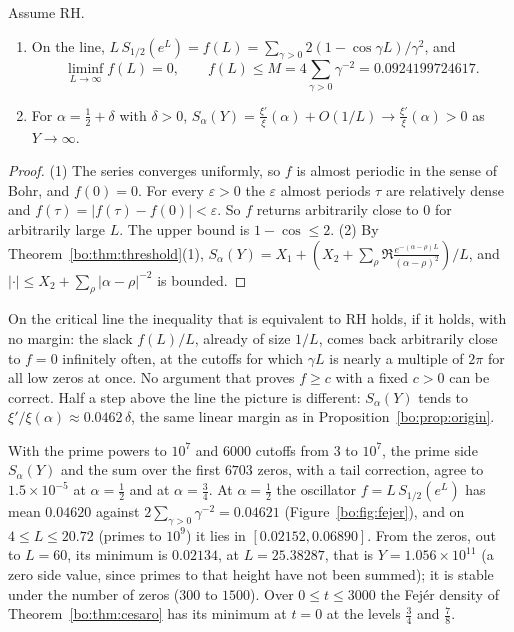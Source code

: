 \begin{proposition}[Margin]\label{bo:prop:margin}
Assume RH.
\begin{enumerate}
\item On the line, $L\,S_{1/2}(e^L)=f(L)=\sum_{\gamma>0}2(1-\cos\gamma L)/\gamma^2$, and
\[
\liminf_{L\to\infty}f(L)=0,\qquad f(L)\le M=4\sum_{\gamma>0}\gamma^{-2}=0.0924199724617 .
\]
\item For $\alpha=\frac12+\delta$ with $\delta>0$, $S_\alpha(Y)=\frac{\xi'}{\xi}(\alpha)+O(1/L)\to\frac{\xi'}{\xi}(\alpha)>0$ as $Y\to\infty$.
\end{enumerate}
\end{proposition}

\begin{proof}
(1) The series converges uniformly, so $f$ is almost periodic in the sense of Bohr, and $f(0)=0$. For every $\varepsilon>0$ the $\varepsilon$ almost periods $\tau$ are relatively dense and $f(\tau)=|f(\tau)-f(0)|<\varepsilon$. So $f$ returns arbitrarily close to $0$ for arbitrarily large $L$. The upper bound is $1-\cos\le2$. (2) By Theorem~\ref{bo:thm:threshold}(1), $S_\alpha(Y)=X_1+(X_2+\sum_\rho\Re\frac{e^{-(\alpha-\rho)L}}{(\alpha-\rho)^2})/L$, and $|\cdot|\le X_2+\sum_\rho|\alpha-\rho|^{-2}$ is bounded.
\end{proof}

On the critical line the inequality that is equivalent to RH holds, if it holds, with no margin: the slack $f(L)/L$, already of size $1/L$, comes back arbitrarily close to $f=0$ infinitely often, at the cutoffs for which $\gamma L$ is nearly a multiple of $2\pi$ for all low zeros at once. No argument that proves $f\ge c$ with a fixed $c>0$ can be correct. Half a step above the line the picture is different: $S_\alpha(Y)$ tends to $\xi'/\xi(\alpha)\approx0.0462\,\delta$, the same linear margin as in Proposition~\ref{bo:prop:origin}.

\begin{remark}[Computation]\label{bo:comp:fejer}
With the prime powers to $10^7$ and $6000$ cutoffs from $3$ to $10^7$, the prime side $S_\alpha(Y)$ and the sum over the first $6703$ zeros, with a tail correction, agree to $1.5\times10^{-5}$ at $\alpha=\frac12$ and at $\alpha=\frac34$. %
At $\alpha=\frac12$ the oscillator $f=L\,S_{1/2}(e^L)$ has mean $0.04620$ against $2\sum_{\gamma>0}\gamma^{-2}=0.04621$ (Figure~\ref{bo:fig:fejer}), and on $4\le L\le20.72$ (primes to $10^9$) it lies in $[0.02152,0.06890]$. From the zeros, out to $L=60$, its minimum is $0.02134$, at $L=25.38287$, that is $Y=1.056\times10^{11}$ (a zero side value, since primes to that height have not been summed); it is stable under the number of zeros ($300$ to $1500$). Over $0\le t\le3000$ the Fej\'er density of Theorem~\ref{bo:thm:cesaro} has its minimum at $t=0$ at the levels $\frac34$ and $\frac78$. %
\end{remark}

